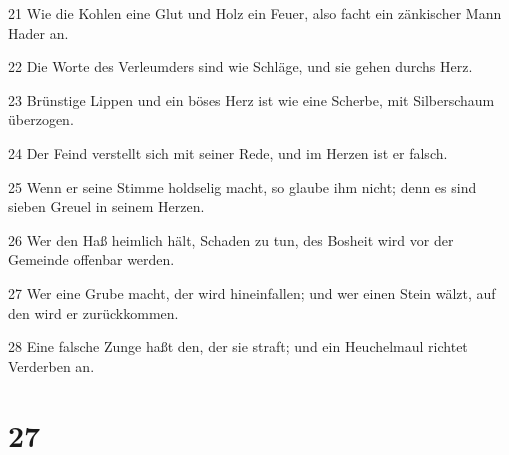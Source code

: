 \par 21 Wie die Kohlen eine Glut und Holz ein Feuer, also facht ein zänkischer Mann Hader an.
\par 22 Die Worte des Verleumders sind wie Schläge, und sie gehen durchs Herz.
\par 23 Brünstige Lippen und ein böses Herz ist wie eine Scherbe, mit Silberschaum überzogen.
\par 24 Der Feind verstellt sich mit seiner Rede, und im Herzen ist er falsch.
\par 25 Wenn er seine Stimme holdselig macht, so glaube ihm nicht; denn es sind sieben Greuel in seinem Herzen.
\par 26 Wer den Haß heimlich hält, Schaden zu tun, des Bosheit wird vor der Gemeinde offenbar werden.
\par 27 Wer eine Grube macht, der wird hineinfallen; und wer einen Stein wälzt, auf den wird er zurückkommen.
\par 28 Eine falsche Zunge haßt den, der sie straft; und ein Heuchelmaul richtet Verderben an.

\chapter{27}

